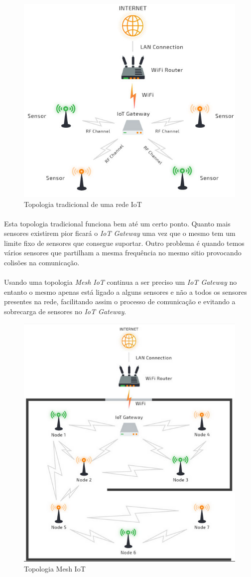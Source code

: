 \documentclass[letterpaper, 11pt]{article}
\begin{document}
\begin{figure}[htbp]
\centering
\includegraphics[width=10 cm]{imagens/IoT.png}
\caption{Topologia tradicional de uma rede IoT}
\end{figure}

\paragraph{}
Esta topologia tradicional funciona bem até um certo ponto. Quanto mais sensores existirem pior ficará o \emph{IoT Gateway} uma vez que o mesmo tem um limite fixo de sensores que consegue
suportar. Outro problema é quando temos vários sensores que partilham a mesma frequência no mesmo sitio provocando colisões na comunicação.

\paragraph{}
Usando uma topologia \emph{Mesh IoT} continua a ser preciso um \emph{IoT Gateway} no entanto o mesmo apenas está ligado a alguns sensores e não a todos os sensores presentes na rede, facilitando
assim o processo de comunicação e evitando a sobrecarga de sensores no \emph{IoT Gateway}.

\begin{figure}[htbp]
\centering
\includegraphics[width=9 cm]{imagens/IoT2.png}
\caption{Topologia Mesh IoT}
\end{figure}
\end{document}
